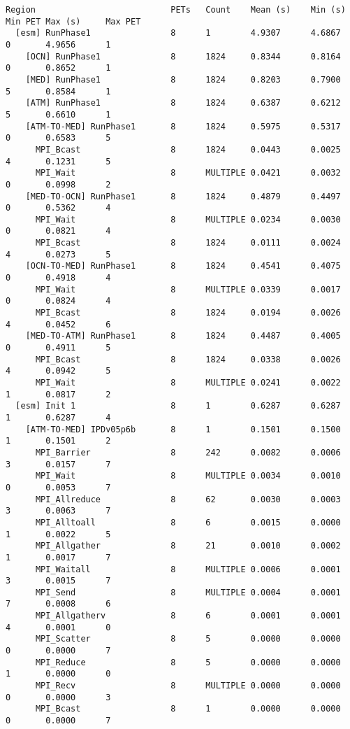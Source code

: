 \begin{verbatim}
Region                           PETs   Count    Mean (s)    Min (s)     Min PET Max (s)     Max PET
  [esm] RunPhase1                8      1        4.9307      4.6867      0       4.9656      1
    [OCN] RunPhase1              8      1824     0.8344      0.8164      0       0.8652      1
    [MED] RunPhase1              8      1824     0.8203      0.7900      5       0.8584      1
    [ATM] RunPhase1              8      1824     0.6387      0.6212      5       0.6610      1
    [ATM-TO-MED] RunPhase1       8      1824     0.5975      0.5317      0       0.6583      5
      MPI_Bcast                  8      1824     0.0443      0.0025      4       0.1231      5
      MPI_Wait                   8      MULTIPLE 0.0421      0.0032      0       0.0998      2
    [MED-TO-OCN] RunPhase1       8      1824     0.4879      0.4497      0       0.5362      4
      MPI_Wait                   8      MULTIPLE 0.0234      0.0030      0       0.0821      4
      MPI_Bcast                  8      1824     0.0111      0.0024      4       0.0273      5
    [OCN-TO-MED] RunPhase1       8      1824     0.4541      0.4075      0       0.4918      4
      MPI_Wait                   8      MULTIPLE 0.0339      0.0017      0       0.0824      4
      MPI_Bcast                  8      1824     0.0194      0.0026      4       0.0452      6
    [MED-TO-ATM] RunPhase1       8      1824     0.4487      0.4005      0       0.4911      5
      MPI_Bcast                  8      1824     0.0338      0.0026      4       0.0942      5
      MPI_Wait                   8      MULTIPLE 0.0241      0.0022      1       0.0817      2
  [esm] Init 1                   8      1        0.6287      0.6287      1       0.6287      4
    [ATM-TO-MED] IPDv05p6b       8      1        0.1501      0.1500      1       0.1501      2
      MPI_Barrier                8      242      0.0082      0.0006      3       0.0157      7
      MPI_Wait                   8      MULTIPLE 0.0034      0.0010      0       0.0053      7
      MPI_Allreduce              8      62       0.0030      0.0003      3       0.0063      7
      MPI_Alltoall               8      6        0.0015      0.0000      1       0.0022      5
      MPI_Allgather              8      21       0.0010      0.0002      1       0.0017      7
      MPI_Waitall                8      MULTIPLE 0.0006      0.0001      3       0.0015      7
      MPI_Send                   8      MULTIPLE 0.0004      0.0001      7       0.0008      6
      MPI_Allgatherv             8      6        0.0001      0.0001      4       0.0001      0
      MPI_Scatter                8      5        0.0000      0.0000      0       0.0000      7
      MPI_Reduce                 8      5        0.0000      0.0000      1       0.0000      0
      MPI_Recv                   8      MULTIPLE 0.0000      0.0000      0       0.0000      3
      MPI_Bcast                  8      1        0.0000      0.0000      0       0.0000      7
\end{verbatim}

